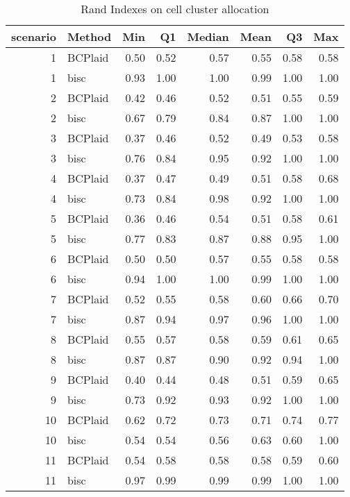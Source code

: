 \begin{table}[ht]
\caption{Rand Indexes on cell cluster allocation}
\vspace{1.5cm}
\centering
\begin{tabular}{rlrrrrrr}
  \toprule
scenario & Method & Min & Q1 & Median & Mean & Q3 & Max \\ 
  \midrule
  1 & BCPlaid & 0.50 & 0.52 & 0.57 & 0.55 & 0.58 & 0.58 \\ 
    1 & bisc & 0.93 & 1.00 & 1.00 & 0.99 & 1.00 & 1.00 \\ 
    2 & BCPlaid & 0.42 & 0.46 & 0.52 & 0.51 & 0.55 & 0.59 \\ 
    2 & bisc & 0.67 & 0.79 & 0.84 & 0.87 & 1.00 & 1.00 \\ 
    3 & BCPlaid & 0.37 & 0.46 & 0.52 & 0.49 & 0.53 & 0.58 \\ 
    3 & bisc & 0.76 & 0.84 & 0.95 & 0.92 & 1.00 & 1.00 \\ 
    4 & BCPlaid & 0.37 & 0.47 & 0.49 & 0.51 & 0.58 & 0.68 \\ 
    4 & bisc & 0.73 & 0.84 & 0.98 & 0.92 & 1.00 & 1.00 \\ 
    5 & BCPlaid & 0.36 & 0.46 & 0.54 & 0.51 & 0.58 & 0.61 \\ 
    5 & bisc & 0.77 & 0.83 & 0.87 & 0.88 & 0.95 & 1.00 \\ 
    6 & BCPlaid & 0.50 & 0.50 & 0.57 & 0.55 & 0.58 & 0.58 \\ 
    6 & bisc & 0.94 & 1.00 & 1.00 & 0.99 & 1.00 & 1.00 \\ 
    7 & BCPlaid & 0.52 & 0.55 & 0.58 & 0.60 & 0.66 & 0.70 \\ 
    7 & bisc & 0.87 & 0.94 & 0.97 & 0.96 & 1.00 & 1.00 \\ 
    8 & BCPlaid & 0.55 & 0.57 & 0.58 & 0.59 & 0.61 & 0.65 \\ 
    8 & bisc & 0.87 & 0.87 & 0.90 & 0.92 & 0.94 & 1.00 \\ 
    9 & BCPlaid & 0.40 & 0.44 & 0.48 & 0.51 & 0.59 & 0.65 \\ 
    9 & bisc & 0.73 & 0.92 & 0.93 & 0.92 & 1.00 & 1.00 \\ 
   10 & BCPlaid & 0.62 & 0.72 & 0.73 & 0.71 & 0.74 & 0.77 \\ 
   10 & bisc & 0.54 & 0.54 & 0.56 & 0.63 & 0.60 & 1.00 \\ 
   11 & BCPlaid & 0.54 & 0.58 & 0.58 & 0.58 & 0.59 & 0.60 \\ 
   11 & bisc & 0.97 & 0.99 & 0.99 & 0.99 & 1.00 & 1.00 \\ 

\end{tabular}
\end{table}
